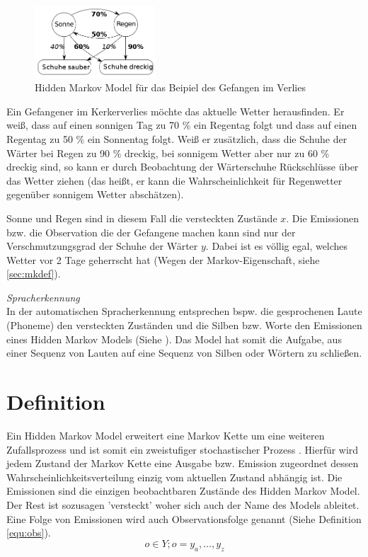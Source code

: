 \begin{figure}[htbp] \centering
    \includegraphics[width=0.4\textwidth]{Bilder/Kap3/hmm_example.png}
    \caption{Hidden Markov Model für das Beipiel des Gefangen im Verlies}
    \label{fig:hmm_example}
\end{figure}

Ein Gefangener im Kerkerverlies möchte das aktuelle Wetter herausfinden. Er weiß, dass auf einen sonnigen Tag zu 70 \% ein Regentag folgt und dass auf einen Regentag zu 50 \% ein Sonnentag folgt. Weiß er zusätzlich, dass die Schuhe der Wärter bei Regen zu 90 \% dreckig, bei sonnigem Wetter aber nur zu 60 \% dreckig sind, so kann er durch Beobachtung der Wärterschuhe Rückschlüsse über das Wetter ziehen (das heißt, er kann die Wahrscheinlichkeit für Regenwetter gegenüber sonnigem Wetter abschätzen). 

Sonne und Regen sind in diesem Fall die versteckten Zustände $x$. Die  Emissionen bzw. die Observation die der Gefangene machen kann sind nur der Verschmutzungsgrad der Schuhe der Wärter $y$. Dabei ist es völlig egal, welches Wetter vor 2 Tage geherrscht hat (Wegen der Markov-Eigenschaft, siehe \ref{sec:mkdef}).

\textit{ Spracherkennung } \\
In der automatischen Spracherkennung entsprechen bspw. die gesprochenen Laute  (Phoneme) den versteckten Zuständen und die Silben bzw. Worte den Emissionen eines Hidden Markov Models (Siehe \cite{speech}). 
Das Model hat somit die Aufgabe, aus einer Sequenz von Lauten auf eine Sequenz von Silben oder Wörtern zu schließen.



\section{Definition}
Ein Hidden Markov Model erweitert eine Markov Kette um eine weiteren Zufallsprozess und ist somit ein zweistufiger stochastischer Prozess \cite[67]{mmmFink}. Hierfür wird jedem Zustand der Markov Kette eine Ausgabe bzw. Emission zugeordnet dessen Wahrscheinlichkeitsverteilung einzig vom aktuellen Zustand abhängig ist. Die Emissionen sind die einzigen beobachtbaren Zustände des Hidden Markov Model. Der Rest ist sozusagen 'versteckt' woher sich auch der Name des Models ableitet. Eine Folge von Emissionen wird auch Observationsfolge genannt (Siehe Definition \ref{equ:obs}).
\begin{equation}
\label{equ:obs}
o \in Y; o = y_a, \ldots, y_z
\end{equation}


